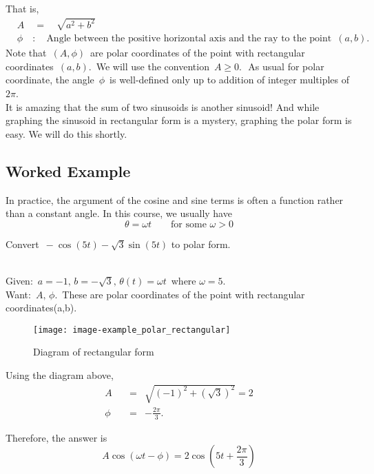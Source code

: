 That is,
\begin{align*}
  &A \quad = \quad \sqrt{a^2 + b^2} \\
  &\phi \quad : \quad
    \text {Angle between the positive horizontal axis and the ray to the point }\, (a, b).
\end{align*} 
Note that $\, (A,\phi )\,$ are polar coordinates of the point with rectangular coordinates
$\, (a,b).\,$ We will use the convention $\, A\geq 0.\, \,$
As usual for polar coordinate, the angle $\, \phi \,$ is well-defined
only up to addition of integer multiples of $2\pi$. \\

It is amazing that the sum of two sinusoids is another sinusoid!
And while graphing the sinusoid in rectangular form is a mystery,
graphing the polar form is easy. We will do this shortly. 
\clearpage

\subsection{Worked Example}
In practice, the argument of the cosine and sine terms is often a function rather than a constant angle.
In this course, we usually have
\begin{equation*}
  \theta = \omega t \qquad \text{for some } \omega > 0
\end{equation*}

\begin{example}
  Convert $\,  -\cos (5t) - \sqrt {3} \sin (5t)$ to polar form.
\end{example}
\Solution \\
Given: $\, a=-1,\, b=-\sqrt {3},\, \theta (t)=\omega t\,$ where $\omega = 5$.\\
Want: $\, A,\, \phi .\,$ These are polar coordinates of the point with rectangular coordinates(a,b). 
\begin{figure}[ht!]
  \centering
  \texttt{[image: image-example\_polar\_rectangular]}
  \caption{Diagram of  rectangular form}
\end{figure}

Using the diagram above,
\begin{eqnarray*}
  \displaystyle A \quad & \displaystyle = & \displaystyle \sqrt{(-1)^2 + (\sqrt{3})^2} = 2\\
  \displaystyle \phi \quad & \displaystyle = & \displaystyle - \frac{2 \pi}{3}. 
\end{eqnarray*}

Therefore, the answer is
\begin{equation*}
  \displaystyle A \cos (\omega t - \phi) \displaystyle = \displaystyle 2 \cos (5t + \frac{2 \pi}{3} )
\end{equation*}

